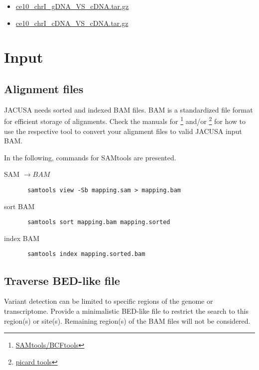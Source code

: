 \documentclass[10pt, a4paper]{article}
\begin{document}
\begin{itemize}
  \item 
  \href{http://www.age.mpg.com/software/jacusa/sample_data/ce10_chrI_gDNA_VS_cDNA.tar.gz}{ce10\_chrI\_gDNA\_VS\_cDNA.tar.gz}
  \item 
  \href{http://www.age.mpg.com/software/jacusa/sample_data/ce10_chrI_cDNA_VS_cDNA.tar.gz}{ce10\_chrI\_cDNA\_VS\_cDNA.tar.gz}
\end{itemize}
\section{Input}
\subsection{Alignment files}
JACUSA needs sorted and indexed BAM files. BAM is a standardized file format for
efficient storage of alignments. Check the manuals for
\footnote{\href{http://samtools.sourceforge.net/}{SAMtools/BCFtools}} and/or
\footnote{\href{http://broadinstitute.github.io/picard/}{picard tools}} for how to use the
respective tool to convert your alignment files to valid JACUSA input BAM.

In the following, commands for SAMtools are presented.
\begin{description}
\item[SAM $\rightarrow BAM$] \begin{verbatim} samtools view -Sb mapping.sam > mapping.bam \end{verbatim}
\item[sort BAM] \begin{verbatim} samtools sort mapping.bam mapping.sorted \end{verbatim} 
\item[index BAM] \begin{verbatim} samtools index mapping.sorted.bam \end{verbatim}
\end{description}
\subsection{Traverse BED-like file}
Variant detection can be limited to specific regions of the genome or transcriptome.  Provide a
minimalistic BED-like file to restrict the search to this region(s) or site(s). Remaining region(s)
of the BAM files will not be considered.
\end{document}
